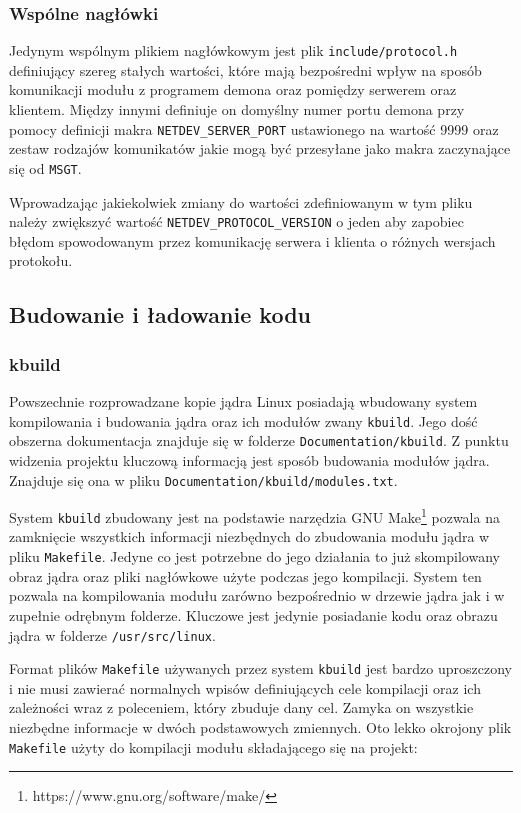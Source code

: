 \documentclass[10pt]{article}
\begin{document}
\subsubsection{Wspólne nagłówki}

Jedynym wspólnym plikiem nagłówkowym jest plik \texttt{include/protocol.h} definiujący szereg stałych wartości, które mają bezpośredni wpływ na sposób komunikacji modułu z programem demona oraz pomiędzy serwerem oraz klientem. Między innymi definiuje on domyślny numer portu demona przy pomocy definicji makra \texttt{NETDEV\_SERVER\_PORT} ustawionego na wartość 9999 oraz zestaw rodzajów komunikatów jakie mogą być przesyłane jako makra zaczynające się od \texttt{MSGT}.

Wprowadzając jakiekolwiek zmiany do wartości zdefiniowanym w tym pliku należy zwiększyć wartość \texttt{NETDEV\_PROTOCOL\_VERSION} o jeden aby zapobiec błędom spowodowanym przez komunikację serwera i klienta o różnych wersjach protokołu.

\subsection{Budowanie i ładowanie kodu}

\subsubsection{kbuild}

Powszechnie rozprowadzane kopie jądra Linux posiadają wbudowany system kompilowania i budowania jądra oraz ich modułów zwany \texttt{kbuild}. Jego dość obszerna dokumentacja znajduje się w folderze \texttt{Documentation/kbuild}. Z punktu widzenia projektu kluczową informacją jest sposób budowania modułów jądra. Znajduje się ona w pliku \texttt{Documentation/kbuild/modules.txt}.

System \texttt{kbuild} zbudowany jest na podstawie narzędzia GNU Make\footnote{https://www.gnu.org/software/make/} pozwala na zamknięcie wszystkich informacji niezbędnych do zbudowania modułu jądra w pliku \texttt{Makefile}. Jedyne co jest potrzebne do jego działania to już skompilowany obraz jądra oraz pliki nagłówkowe użyte podczas jego kompilacji. System ten pozwala na kompilowania modułu zarówno bezpośrednio w drzewie jądra jak i w zupełnie odrębnym folderze. Kluczowe jest jedynie posiadanie kodu oraz obrazu jądra w folderze \texttt{/usr/src/linux}.

Format plików \texttt{Makefile} używanych przez system \texttt{kbuild} jest bardzo uproszczony i nie musi zawierać normalnych wpisów definiujących cele kompilacji oraz ich zależności wraz z poleceniem, który zbuduje dany cel. Zamyka on wszystkie niezbędne informacje w dwóch podstawowych zmiennych. Oto lekko okrojony plik \texttt{Makefile} użyty do kompilacji modułu składającego się na projekt:
\end{document}
